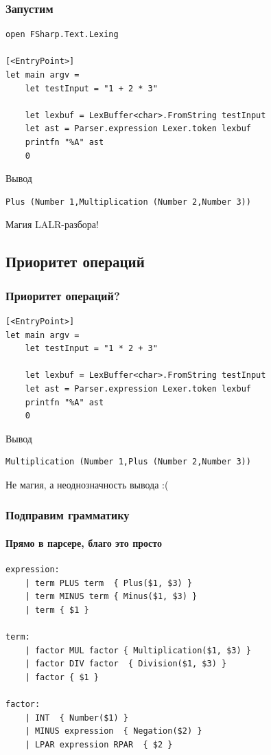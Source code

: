 \documentclass[xetex,mathserif,serif]{beamer}
\begin{document}
    \begin{frame}[fragile]
        \frametitle{Запустим}
        \begin{verbatim}
open FSharp.Text.Lexing

[<EntryPoint>]
let main argv =
    let testInput = "1 + 2 * 3"

    let lexbuf = LexBuffer<char>.FromString testInput
    let ast = Parser.expression Lexer.token lexbuf
    printfn "%A" ast
    0 
        \end{verbatim}
        \begin{exampleblock}{Вывод}
            \begin{verbatim}
Plus (Number 1,Multiplication (Number 2,Number 3))
            \end{verbatim}
        \end{exampleblock}
        Магия LALR-разбора!
    \end{frame}

    \subsection{Приоритет операций}

    \begin{frame}[fragile]
        \frametitle{Приоритет операций?}
        \begin{verbatim}
[<EntryPoint>]
let main argv =
    let testInput = "1 * 2 + 3"

    let lexbuf = LexBuffer<char>.FromString testInput
    let ast = Parser.expression Lexer.token lexbuf
    printfn "%A" ast
    0 
        \end{verbatim}
        \begin{exampleblock}{Вывод}
            \begin{verbatim}
Multiplication (Number 1,Plus (Number 2,Number 3))
            \end{verbatim}
        \end{exampleblock}
        Не магия, а неоднозначность вывода :(
    \end{frame}

    \begin{frame}[fragile]
        \frametitle{Подправим грамматику}
        \framesubtitle{Прямо в парсере, благо это просто}
        \begin{small}
            \begin{verbatim}
expression:
    | term PLUS term  { Plus($1, $3) }
    | term MINUS term { Minus($1, $3) }
    | term { $1 }

term:
    | factor MUL factor { Multiplication($1, $3) }
    | factor DIV factor  { Division($1, $3) }
    | factor { $1 }

factor:
    | INT  { Number($1) }
    | MINUS expression  { Negation($2) }
    | LPAR expression RPAR  { $2 }
            \end{verbatim}
        \end{small}
    \end{frame}
\end{document}
